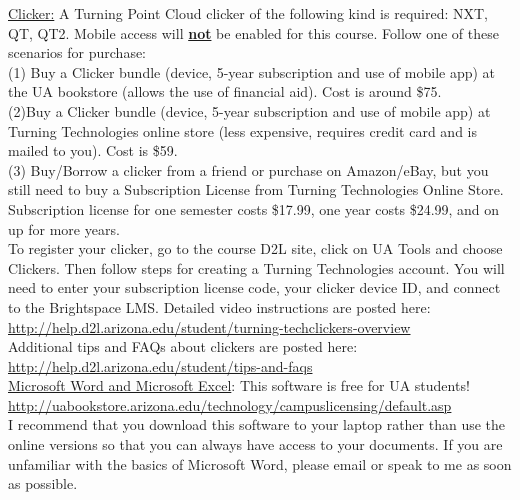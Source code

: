 \documentclass[11pt]{article}
\begin{document}
\hangindent=5cm 
\underline{Clicker:}
A Turning Point Cloud clicker of the following kind is required: NXT, QT, QT2.  
Mobile access will \textbf{\underline{not}} be enabled for this course.
Follow one of these scenarios for purchase:\\
(1) Buy a Clicker bundle (device, 5-year subscription and use of mobile app) at the UA bookstore (allows the use of financial aid). Cost is around \$75.\\
(2)Buy a Clicker bundle (device, 5-year subscription and use of mobile app) at Turning Technologies online store (less expensive, requires credit card and is mailed to you). Cost is \$59.\\
(3) Buy/Borrow a clicker from a friend or purchase on Amazon/eBay, but you still need to buy a Subscription License from Turning Technologies Online Store. Subscription license for one semester costs \$17.99, one year costs \$24.99, and on up for more years. \\
\hangindent=5cm 
To register your clicker, go to the course D2L site, click on UA Tools and choose Clickers.  Then follow steps for creating a Turning Technologies account.  You will need to enter your subscription license code, your clicker device ID, and connect to the Brightspace LMS. 
Detailed video instructions are posted here:\\
\text{}\qquad\href{http://help.d2l.arizona.edu/student/turning-techclickers-overview}{http://help.d2l.arizona.edu/student/turning-techclickers-overview}\\
Additional tips and FAQs about clickers are posted here:\\
\text{}\qquad\href{http://help.d2l.arizona.edu/student/tips-and-faqs}{http://help.d2l.arizona.edu/student/tips-and-faqs}\\

\hangindent=5cm 
\underline{Microsoft Word and Microsoft Excel}: This software is free for UA students!\\
\text{}\qquad\href{http://uabookstore.arizona.edu/technology/campuslicensing/default.asp}{http://uabookstore.arizona.edu/technology/campuslicensing/default.asp}\\
I recommend that you download this software to your laptop rather than use the online versions so that you can always have access to your documents.
If you are unfamiliar with the basics of Microsoft Word, please email or speak to me as soon as possible.
\end{document}
